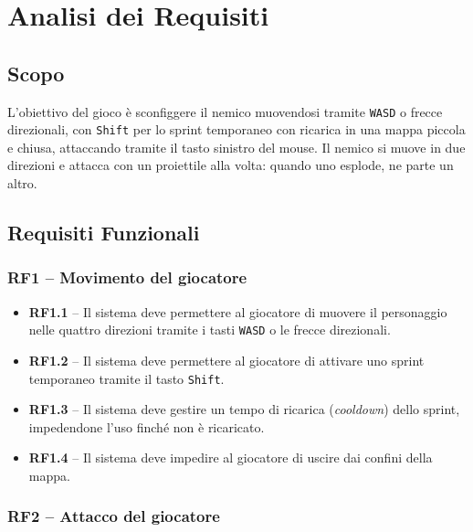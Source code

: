 \documentclass[12pt,a4paper]{article}
\newcommand{\req}[2]{%
  \noindent\textbf{#1} -- #2\par\smallskip
}
\begin{document}
\section{Analisi dei Requisiti}
\begin{small}
\subsection{Scopo}

L'obiettivo del gioco è sconfiggere il nemico muovendosi tramite \texttt{WASD} o frecce direzionali,
con \texttt{Shift} per lo sprint temporaneo con ricarica in una mappa piccola e chiusa, attaccando
tramite il tasto sinistro del mouse. Il nemico si muove in due direzioni e attacca con un proiettile
alla volta: quando uno esplode, ne parte un altro.

\subsection{Requisiti Funzionali}

\subsubsection{RF1 – Movimento del giocatore}

\begin{itemize}[leftmargin=2em]
  \item \req{RF1.1}{Il sistema deve permettere al giocatore di muovere il personaggio nelle quattro
    direzioni tramite i tasti \texttt{WASD} o le frecce direzionali.}
  \item \req{RF1.2}{Il sistema deve permettere al giocatore di attivare uno sprint temporaneo tramite
    il tasto \texttt{Shift}.}
  \item \req{RF1.3}{Il sistema deve gestire un tempo di ricarica (\textit{cooldown}) dello sprint,
    impedendone l'uso finché non è ricaricato.}
  \item \req{RF1.4}{Il sistema deve impedire al giocatore di uscire dai confini della mappa.}
\end{itemize}

\subsubsection{RF2 – Attacco del giocatore}


\end{small}
\end{document}
